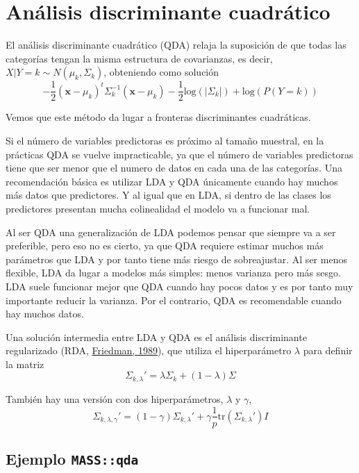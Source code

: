 \documentclass[
  spanish,
]{book}
\theoremstyle{break}
\theoremstyle{definition}
\theoremstyle{definition}
\theoremstyle{definition}
\theoremstyle{definition}
\theoremstyle{remark}
\begin{document}
\hypertarget{anuxe1lisis-discriminante-cuadruxe1tico}{%
\section{Análisis discriminante cuadrático}\label{anuxe1lisis-discriminante-cuadruxe1tico}}

El análisis discriminante cuadrático (QDA) relaja la suposición de que todas las categorías tengan la misma estructura de covarianzas, es decir, \(X | Y = k \sim N(\mu_k, \Sigma_k)\), obteniendo como solución
\[-\frac{1}{2} (\mathbf{x} - \mu_k)^t \Sigma^{-1}_k (\mathbf{x} - \mu_k) - \frac{1}{2} \mbox{log}(|\Sigma_k|) + \mbox{log}(P(Y = k))\]

Vemos que este método da lugar a fronteras discriminantes cuadráticas.

Si el número de variables predictoras es próximo al tamaño muestral, en la prácticas QDA se vuelve impracticable, ya que el número de variables predictoras tiene que ser menor que el numero de datos en cada una de las categorías. Una recomendación básica es utilizar LDA y QDA únicamente cuando hay muchos más datos que predictores. Y al igual que en LDA, si dentro de las clases los predictores presentan mucha colinealidad el modelo va a funcionar mal.

Al ser QDA una generalización de LDA podemos pensar que siempre va a ser preferible, pero eso no es cierto, ya que QDA requiere estimar muchos más parámetros que LDA y por tanto tiene más riesgo de sobreajustar. Al ser menos flexible, LDA da lugar a modelos más simples: menos varianza pero más sesgo. LDA suele funcionar mejor que QDA cuando hay pocos datos y es por tanto muy importante reducir la varianza. Por el contrario, QDA es recomendable cuando hay muchos datos.

Una solución intermedia entre LDA y QDA es el análisis discriminante regularizado (RDA, \protect\hyperlink{ref-friedman1989regularized}{Friedman, 1989}), que utiliza el hiperparámetro \(\lambda\) para definir la matriz
\[\Sigma_{k,\lambda}' = \lambda\Sigma_k + (1 - \lambda) \Sigma
\]

También hay una versión con dos hiperparámetros, \(\lambda\) y \(\gamma\),
\[\Sigma_{k,\lambda,\gamma}' = (1 - \gamma) \Sigma_{k,\lambda}' + \gamma \frac{1}{p} \mbox{tr} (\Sigma_{k,\lambda}')I
\]

\hypertarget{ejemplo-massqda}{%
\subsection{\texorpdfstring{Ejemplo \texttt{MASS::qda}}{Ejemplo MASS::qda}}\label{ejemplo-massqda}}
\end{document}
